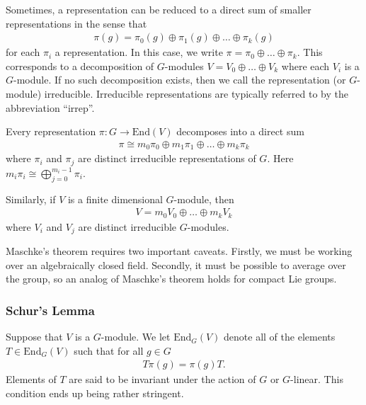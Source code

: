Sometimes, a representation can be reduced to a direct sum of smaller representations in the sense that 
\begin{align}
    \pi(g) = \pi_0(g) \oplus \pi_1(g) \oplus \dots \oplus \pi_k(g)
\end{align}
for each $\pi_i$ a representation.
In this case, we write $\pi = \pi_0 \oplus \dots \oplus \pi_k$.
This corresponds to a decomposition of $G$-modules $V = V_0 \oplus \dots \oplus V_k$ where each $V_i$ is a $G$-module.
If no such decomposition exists, then we call the representation (or $G$-module) irreducible.
Irreducible representations are typically referred to by the abbreviation ``irrep''.

\begin{theorem} \label{thm:maschkes-theorem}
    Every representation $\pi : G \to \mathrm{End}(V)$ decomposes into a direct sum
    \begin{align}
        \pi \cong m_0 \pi_0 \oplus m_1 \pi_1 \oplus \dots \oplus m_k \pi_k
    \end{align}
    where $\pi_i$ and $\pi_j$ are distinct irreducible representations of $G$. Here $m_i \pi_i \cong \bigoplus_{j=0}^{m_i - 1} \pi_i$.

    Similarly, if $V$ is a finite dimensional $G$-module, then 
    \begin{align}
        V = m_0 V_0 \oplus \dots \oplus m_k V_k
    \end{align}
    where $V_i$ and $V_j$ are distinct irreducible $G$-modules.
\end{theorem}
Maschke's theorem requires two important caveats. 
Firstly, we must be working over an algebraically closed field. 
Secondly, it must be possible to average over the group, so an analog of Maschke's theorem holds for compact Lie groups.

\subsubsection{Schur's Lemma}

Suppose that $V$ is a $G$-module. 
We let $\mathrm{End}_G(V)$ denote all of the elements $T \in \mathrm{End}_G(V)$ such that for all $g \in G$
\begin{align}
    T \pi(g) = \pi(g)T.
\end{align}
Elements of $T$ are said to be invariant under the action of $G$ or $G$-linear.
This condition ends up being rather stringent.

